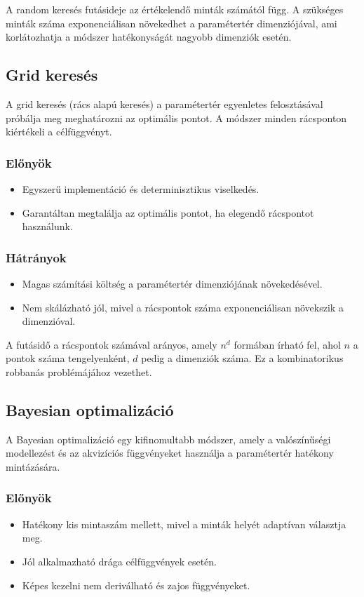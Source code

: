 A random keresés futásideje az értékelendő minták számától függ. A szükséges minták száma exponenciálisan növekedhet a paramétertér dimenziójával, ami korlátozhatja a módszer hatékonyságát nagyobb dimenziók esetén.

\subsection{Grid keresés}
A grid keresés (rács alapú keresés) a paramétertér egyenletes felosztásával próbálja meg meghatározni az optimális pontot. A módszer minden rácsponton kiértékeli a célfüggvényt.

\subsubsection{Előnyök}
\begin{itemize}
    \item Egyszerű implementáció és determinisztikus viselkedés.
    \item Garantáltan megtalálja az optimális pontot, ha elegendő rácspontot használunk.
\end{itemize}

\subsubsection{Hátrányok}
\begin{itemize}
    \item Magas számítási költség a paramétertér dimenziójának növekedésével.
    \item Nem skálázható jól, mivel a rácspontok száma exponenciálisan növekszik a dimenzióval.
\end{itemize}

A futásidő a rácspontok számával arányos, amely $n^d$ formában írható fel, ahol $n$ a pontok száma tengelyenként, $d$ pedig a dimenziók száma. Ez a kombinatorikus robbanás problémájához vezethet.

\subsection{Bayesian optimalizáció}
A Bayesian optimalizáció egy kifinomultabb módszer, amely a valószínűségi modellezést és az akvizíciós függvényeket használja a paramétertér hatékony mintázására.

\subsubsection{Előnyök}
\begin{itemize}
    \item Hatékony kis mintaszám mellett, mivel a minták helyét adaptívan választja meg.
    \item Jól alkalmazható drága célfüggvények esetén.
    \item Képes kezelni nem deriválható és zajos függvényeket.
\end{itemize}

